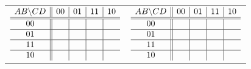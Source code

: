 \documentclass{article}
\begin{document}
\begin{tabular}{ll}

$ \begin{array} {c||c|c|c|c}
        AB \backslash CD & 00 & 01 & 11 & 10 \\ \hline \hline
        00        &    &    &    &    \\ \hline
        01        &    &    &    &    \\ \hline
        11        &    &    &    &    \\ \hline
        10        &    &    &    &    \\
\end{array} $

& 

$ \begin{array} {c||c|c|c|c}
        AB \backslash CD & 00 & 01 & 11 & 10 \\ \hline \hline
        00        &    &    &    &    \\ \hline
        01        &    &    &    &    \\ \hline
        11        &    &    &    &    \\ \hline
        10        &    &    &    &    \\
\end{array} $

\\


\end{tabular}
\end{document}
